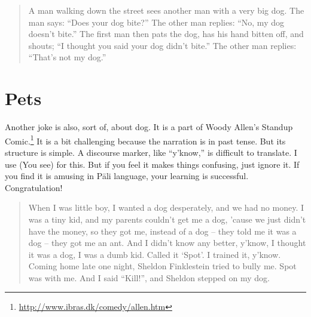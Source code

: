 \begin{quote}
A man walking down the street sees another man with a very big dog.  The man says: ``Does your dog bite?'' The other man replies: ``No, my dog doesn't bite.''  The first man then pats the dog, has his hand bitten off, and shouts; ``I thought you said your dog didn't bite.'' The other man replies: ``That's not my dog.''
\end{quote}

{}
\section*{Pets}

Another joke is also, sort of, about dog. It is a part of Woody Allen's Standup Comic.\footnote{\url{http://www.ibras.dk/comedy/allen.htm}} It is a bit challenging because the narration is in past tense. But its structure is simple. A discourse marker, like ``y'know,'' is difficult to translate. I use  (You see) for this. But if you feel it makes things confusing, just ignore it. If you find it is amusing in P\=ali language, your learning is successful. Congratulation! 

\begin{quote}
\end{quote}

\begin{quote}
When I was little boy, I wanted a dog desperately, and we had no money. I was a tiny kid, and my parents couldn't get me a dog, 'cause we just didn't have the money, so they got me, instead of a dog -- they told me it was a dog -- they got me an ant. And I didn't know any better, y'know, I thought it was a dog, I was a dumb kid. Called it `Spot'. I trained it, y'know. Coming home late one night, Sheldon Finklestein tried to bully me. Spot was with me. And I said ``Kill!'', and Sheldon stepped on my dog. 
\end{quote}

